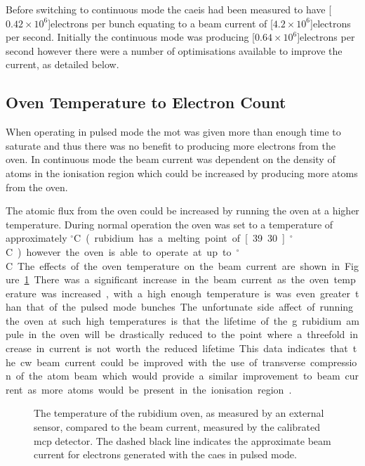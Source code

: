 Before switching to continuous mode the \gls{caeis} had been measured to have \unit[$0.42\times10^6$]{electrons per bunch} equating to a beam current of \unit[$4.2\times10^6$]{electrons per second}.
Initially the continuous mode was producing \unit[$0.64\times10^6$]{electrons per second} however there were a number of optimisations available to improve the current, as detailed below.

\subsection{Oven Temperature to Electron Count}
When operating in pulsed mode the \gls{mot} was given more than enough time to saturate and thus there was no benefit to producing more electrons from the oven.
In continuous mode the beam current was dependent on the density of atoms in the ionisation region which could be increased by producing more atoms from the oven.

The atomic flux from the oven could be increased by running the oven at a higher temperature.
During normal operation the oven was set to a temperature of approximately \unit[80]{$^\circ$C} (rubidium has a melting point of \unit[39.30]{$^\circ$C}) however the oven is able to operate at up to \unit[200]{$^\circ$C}.

The effects of the oven temperature on the beam current are shown in Figure~\ref{figure:oven_counts}.
There was a significant increase in the beam current as the oven temperature was increased, with a high enough temperature is was even greater than that of the pulsed mode bunches.
The unfortunate side affect of running the oven at such high temperatures is that the lifetime of the \unit[5]{g} rubidium ampule in the oven will be drastically reduced to the point where a threefold increase in current is not worth the reduced lifetime.
This data indicates that the \gls{cw} beam current could be improved with the use of transverse compression of the atom beam which would provide a similar improvement to beam current as more atoms would be present in the ionisation region~\cite{tielen_development_2015}.

\begin{figure}
    \center
    
    \caption[Beam current and rubidium oven temperature.]{The temperature of the rubidium oven, as measured by an external sensor, compared to the beam current, measured by the calibrated \gls{mcp} detector.
    The dashed black line indicates the approximate beam current for electrons generated with the \gls{caes} in pulsed mode.}
    \label{figure:oven_counts}
\end{figure}

